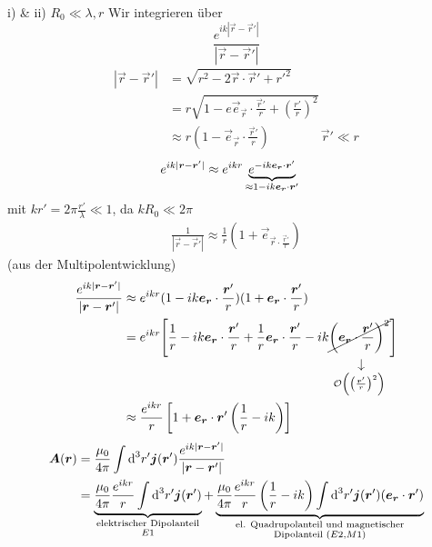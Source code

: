 i) \& ii) $ R_0 \ll \lambda , r $
Wir integrieren über
\begin{equation*}
\frac{e^{i k |\vec{r} - \vec{r}'|}}{|\vec{r} - \vec{r}'|}
\end{equation*}
\begin{align*}
|\vec{r} - \vec{r}'| &= \sqrt{r^2 - 2 \vec{r} \cdot \vec{r}' + r'^2}\\
&= r \sqrt{1 - e \vec{e}_{\vec{r}} \cdot \frac{\vec{r}'}{r} + \left(\frac{r'}{r}\right)^2}\\
&\approx r (1 - \vec{e}_{\vec{r}} \cdot \frac{\vec{r}'}{r}) \qquad \qquad \vec{r}' \ll r
\end{align*}
\begin{align*}
e^{i k |\bm{r} - \bm{r}'|} &\approx e^{i k r} \underbrace{ e ^{ - i k \bm{e}_{\bm{r}} \cdot \bm{r}'}}_{\approx 1 - i k \bm{e}_{\bm{r}} \cdot \bm{r}'}
\end{align*}
mit $ k r' = 2 \pi \frac{r'}{\lambda} \ll 1 $, da $ k R_0 \ll 2 \pi $
\begin{align*}
\frac{1}{|\vec{r} - \vec{r}'|} \approx \frac{1}{r} ( 1 + \vec{e}_{\vec{r} \cdot \frac{\vec{r}'}{r}})
\end{align*}
(aus der Multipolentwicklung)
\begin{align*}
\frac{e^{i k |\vec{r} - \vec{r}'|}}{|\vec{r} - \vec{r}'|} &\approx e^{i k r} (1 - i k \vec{e}_{\vec{r}} \cdot \frac{\vec{r}'}{r}) (1 + \vec{e}_{\vec{r}} \cdot \frac{\vec{r}'}{r})\\
&= e^{i k r} \Bigg[\frac{1}{r} - i k \vec{e}_{\vec{r}} \cdot \frac{\vec{r}'}{r} + \frac{1}{r} \vec{e}_{\vec{r}} \cdot \frac{\vec{r}'}{r} - i k \custo{\rightarrow}{\cancel{\left(\vec{e}_{\vec{r}} \cdot \frac{\vec{r}'}{r}\right)^2}}{\mathcal{O} \left(\left(\frac{\vec{r}'}{r}\right)^2\right)}\Bigg]\\
&\approx \frac{e^{i k r}}{r} \left[1 + \vec{e}_{\vec{r}} \cdot \vec{r}' \left(\frac{1}{r} - i k\right)\right]
\end{align*}
\begin{align*}
\vec{A}(\vec{r}) &= \frac{\mu_0}{4 \pi} \int \dd^3 r' \vec{j}(\vec{r}') \frac{e^{i k |\vec{r} - \vec{r}'|}}{|\vec{r} - \vec{r}'|}\\
&= \ub{\frac{\mu_0}{4 \pi} \frac{e^{i k r}}{r} \int \dd^3 r' \vec{j} (\vec{r}')}_{\mathclap{\substack{\tx{elektrischer Dipolanteil} \\ E1}}} + \ub{\frac{\mu_0}{4 \pi} \frac{e^{i k r}}{r} \left(\frac{1}{r} - ik\right) \int \dd^3 r' \vec{j}(\vec{r}') (\vec{e}_{\vec{r}} \cdot \vec{r}')}_{\mathclap{\substack{\tx{el. Quadrupolanteil und magnetischer} \\ \tx{Dipolanteil } (E2, M1)}}}
\end{align*}

